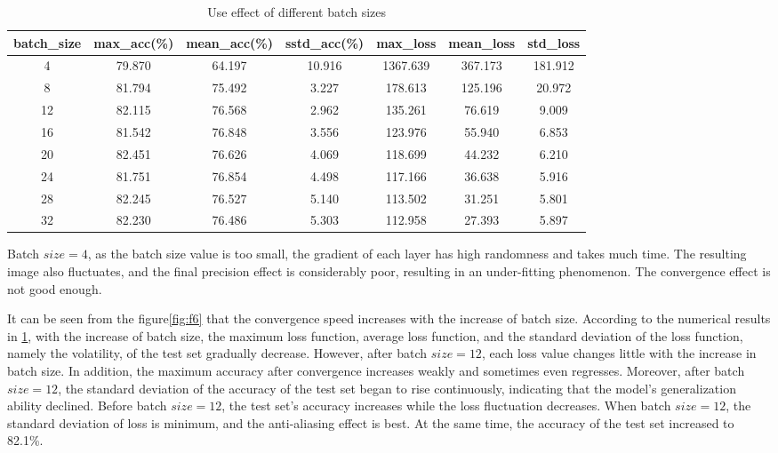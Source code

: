 \documentclass[a4paper,fleqn]{cas-sc}
\begin{document}
\begin{table}
\centering
\caption{Use effect of different batch sizes}
\label{tab:mbv5}
\begin{tabular}{ccccccc}
\hline 
batch\_size & max\_acc(\%) & mean\_acc(\%) & sstd\_acc(\%) & max\_loss & mean\_loss & std\_loss \\
\hline  
4   & 79.870 &  64.197  & 10.916 &  1367.639  & 367.173 & 181.912 \\
 8   & 81.794  & 75.492 & 3.227 &  178.613  & 125.196 & 20.972 \\
 12   & 82.115   & 76.568 & 2.962 &  135.261  & 76.619 & 9.009 \\
 16  & 81.542   & 76.848 & 3.556 &  123.976  & 55.940 & 6.853 \\
 20  &  82.451  & 76.626 & 4.069 &  118.699  & 44.232 & 6.210 \\
 24  & 81.751  & 76.854 & 4.498 &  117.166  & 36.638 & 5.916 \\
 28  & 82.245  & 76.527 & 5.140 &  113.502  & 31.251 & 5.801 \\
 32  & 82.230  & 76.486 & 5.303 &  112.958  & 27.393 & 5.897 \\
\hline
\end{tabular}
\end{table}

Batch $size=4$, as the batch size value is too small, the gradient of each layer has high randomness and takes much time. The resulting image also fluctuates, and the final precision effect is considerably poor, resulting in an under-fitting phenomenon. The convergence effect is not good enough. 

It can be seen from the figure\ref{fig:f6} that the convergence speed increases with the increase of batch size. According to the numerical results in \ref{tab:mbv5}, with the increase of batch size, the maximum loss function, average loss function, and the standard deviation of the loss function, namely the volatility, of the test set gradually decrease. However, after batch $size=12$, each loss value changes little with the increase in batch size. In addition, the maximum accuracy after convergence increases weakly and sometimes even regresses. Moreover, after batch $size=12$, the standard deviation of the accuracy of the test set began to rise continuously, indicating that the model's generalization ability declined. Before batch $size=12$, the test set's accuracy increases while the loss fluctuation decreases. When batch $size=12$, the standard deviation of loss is minimum, and the anti-aliasing effect is best. At the same time, the accuracy of the test set increased to 82.1\%. 
\end{document}
